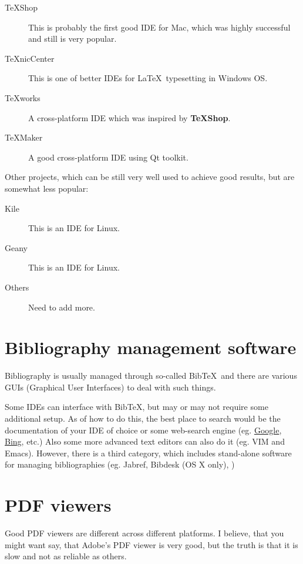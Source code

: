 \begin{description}
    \item[TeXShop] This is probably the first good IDE for Mac, which was highly
        successful and still is very popular.

    \item[TeXnicCenter] This is one of better IDEs for \LaTeX\ typesetting in
        Windows OS. 

    \item[TeXworks] A cross-platform IDE which was inspired by \textbf{TeXShop}.

    \item[TeXMaker] A good cross-platform IDE using Qt toolkit.
\end{description}

Other projects, which can be still very well used to achieve good results, but
are somewhat less popular:
\begin{description}
    \item[Kile] This is an IDE for Linux.
    \item[Geany] This is an IDE for Linux.
    \item[Others] Need to add more.
\end{description}

\section{Bibliography management software}

Bibliography is usually managed through so-called Bib\TeX\ and there are various
GUIs (Graphical User Interfaces) to deal with such things. 

Some IDEs can interface with Bib\TeX, but may or may not require some additional
setup. As of how to do this, the best place to search would be the documentation
of your IDE of choice or some web-search engine (eg.
\href{http://www.google.co.uk}{Google}, \href{http://www.bing.co.uk}{Bing},
etc.)
Also some more advanced text editors can also do it (eg. VIM and Emacs).
However, there is a third category, which includes stand-alone software for
managing bibliographies (eg. Jabref, Bibdesk (OS X only), )

\section{PDF viewers}

Good PDF viewers are different across different platforms. I believe, that you
might want say, that Adobe's PDF viewer is very good, but the truth is that it
is slow and not as reliable as others.

